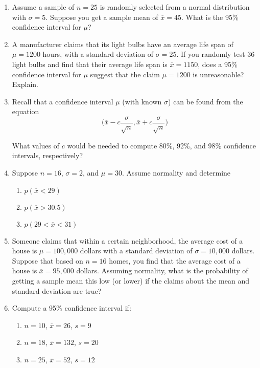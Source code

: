 \documentclass[10pt]{article}
\begin{document}
\begin{enumerate}

\item Assume a sample of $n=25$ is randomly selected from a normal distribution with $\sigma=5$.  Suppose you get a sample mean of $\overline{x}=45$.  What is the 95\% confidence interval for $\mu$?

\item A manufacturer claims that its light bulbs have an average life span of $\mu = 1200$ hours, with a standard deviation of $\sigma=25$.  If you randomly test 36 light bulbs and find that their average life span is $\overline{x}=1150$, does a 95\% confidence interval for $\mu$ suggest that the claim $\mu=1200$ is unreasonable?  Explain.

\item Recall that a confidence interval $\mu$ (with known $\sigma$) can be found from the equation
  \[
    \Biggl(\overline{x}-c\frac{\sigma}{\sqrt{n}}, \overline{x}+c\frac{\sigma}{\sqrt{n}}\Biggr)
  \]

  \noindent
  What values of $c$ would be needed to compute 80\%, 92\%, and 98\% confidence intervals, respectively?

\item Suppose $n=16$, $\sigma=2$, and $\mu=30$.  Assume normality and determine
  \begin{enumerate}
  \item $p(\overline{x}<29)$
  \item $p(\overline{x}>30.5)$
    \item $p(29 < \overline{x} < 31)$
  \end{enumerate}

\item Someone claims that within a certain neighborhood, the average cost of a house is $\mu=100,000$ dollars with a standard deviation of $\sigma=10,000$ dollars.  Suppose that based on $n=16$ homes, you find that the average cost of a house is $\overline{x}=95,000$ dollars.  Assuming normality, what is the probability of getting a sample mean this low (or lower) if the claims about the mean and standard deviation are true?

\item Compute a 95\% confidence interval if:
  \begin{enumerate}
  \item $n=10$, $\overline{x}=26$, $s=9$
  \item $n=18$, $\overline{x}=132$, $s=20$
    \item $n=25$, $\overline{x}=52$, $s=12$
    \end{enumerate}



\end{enumerate}
\end{document}
